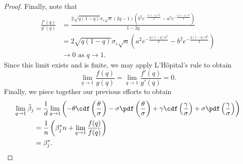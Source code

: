 \begin{proof}
  Finally, note that
  \[
    \begin{aligned}
      \frac{f'(q)}{g'(q)} & = \frac{2\sqrt{q(1-q)}\sigma_\varepsilon \sqrt{n} (2q  - 1)\left(b^2 e^{-\frac{q(1-q)b^2}{2}}- a^2 e^{-\frac{q(1-q)a^2}{2}}\right)}{1 - 2q} \\
                          & =2\sqrt{q(1-q)}\sigma_\varepsilon \sqrt{n} \left(a^2 e^{-\frac{q(1-q)a^2}{2}}- b^2 e^{-\frac{q(1-q)b^2}{2}}\right)                          \\
                          & \rightarrow 0 \text{ as } q \rightarrow 1.
    \end{aligned}
  \]
  Since this limit exists and is finite, we may apply L'Hôpital's rule to obtain
  \[
    \lim_{q \rightarrow 1} \frac{f(q)}{g(q)} = \lim_{q \rightarrow 1} \frac{f'(q)}{g'(q)} = 0.
  \]
  Finally, we piece together our previous efforts to obtain
  \[
    \begin{aligned}
      \lim_{q \rightarrow 1} \hat\beta_j & = \frac{1}{d} \lim_{q \rightarrow 1}\left(- \theta \cdf\left(\frac{\theta}{\sigma}\right) - \sigma \pdf\left(\frac{\theta}{\sigma}\right) + \gamma \cdf\left(\frac{\gamma}{\sigma}\right) + \sigma \pdf\left(\frac{\gamma}{\sigma}\right)\right) \\
                                         & = \frac{1}{n}\left(\beta_j^*n +  \lim_{q \rightarrow 1}\frac{f(q)}{f(q)} \right)                                                                                                                                                                 \\
                                         & = \beta_j^*.
    \end{aligned}
  \]
\end{proof}

% 

